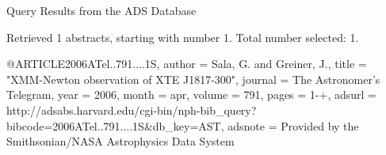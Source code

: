 Query Results from the ADS Database


Retrieved 1 abstracts, starting with number 1.  Total number selected: 1.

@ARTICLE{2006ATel..791....1S,
   author = {{Sala}, G. and {Greiner}, J.},
    title = "{XMM-Newton observation of XTE J1817-300}",
  journal = {The Astronomer's Telegram},
     year = 2006,
    month = apr,
   volume = 791,
    pages = {1-+},
   adsurl = {http://adsabs.harvard.edu/cgi-bin/nph-bib_query?bibcode=2006ATel..791....1S&db_key=AST},
  adsnote = {Provided by the Smithsonian/NASA Astrophysics Data System}
}


